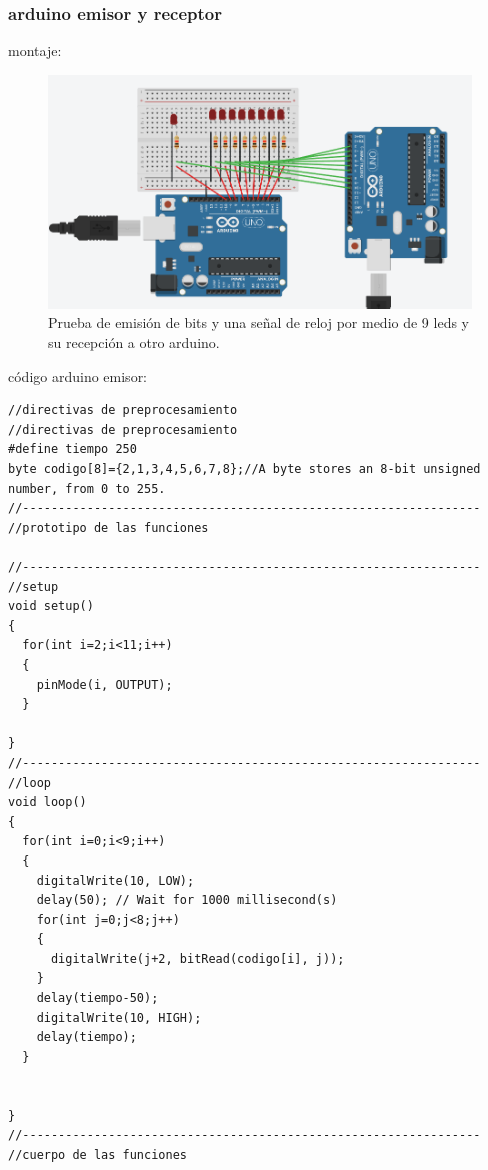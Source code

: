 \documentclass{article}
\begin{document}
\newpage
\subsubsection{arduino emisor y receptor}\label{intento1}

montaje:
\begin{figure}[h]
\includegraphics[scale=0.6]{emisorReceptor1.png}
\centering
\caption{Prueba de emisión de bits y una señal de reloj por medio de 9 leds y su recepción a otro arduino.}
\label{fig:emisorReceptor1}
\end{figure}

código arduino emisor:
\begin{lstlisting}[style=myArduino]//directivas de preprocesamiento
//directivas de preprocesamiento
#define tiempo 250
byte codigo[8]={2,1,3,4,5,6,7,8};//A byte stores an 8-bit unsigned number, from 0 to 255.
//----------------------------------------------------------------
//prototipo de las funciones

//----------------------------------------------------------------
//setup
void setup()
{
  for(int i=2;i<11;i++)
  {
    pinMode(i, OUTPUT);
  }
  
}
//----------------------------------------------------------------
//loop
void loop()
{
  for(int i=0;i<9;i++)
  {
  	digitalWrite(10, LOW);
  	delay(50); // Wait for 1000 millisecond(s)
    for(int j=0;j<8;j++)
    {
      digitalWrite(j+2, bitRead(codigo[i], j));
    }
    delay(tiempo-50);
    digitalWrite(10, HIGH);
    delay(tiempo);
  }
  
  
}
//----------------------------------------------------------------
//cuerpo de las funciones
 
\end{lstlisting}
\end{document}
